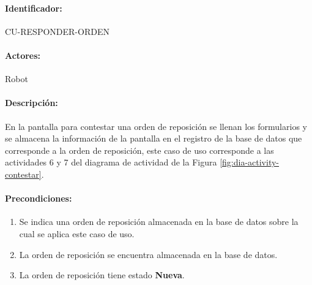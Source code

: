 \paragraph{Identificador:}
CU-RESPONDER-ORDEN
\paragraph{Actores:}
Robot
\paragraph{Descripción:}
En la pantalla para contestar una orden de reposición se llenan los formularios y se almacena la información de la pantalla en el registro de la base de datos que corresponde a la orden de reposición, este caso de uso corresponde a las actividades 6 y 7 del diagrama de actividad de la Figura \ref{fig:dia-activity-contestar}.
\paragraph{Precondiciones:}
\begin{enumerate}
  \item Se indica una orden de reposición almacenada en la base de datos sobre la cual se aplica este caso de uso.
  \item La orden de reposición se encuentra almacenada en la base de datos.
  \item La orden de reposición tiene estado \textbf{Nueva}.
\end{enumerate}
